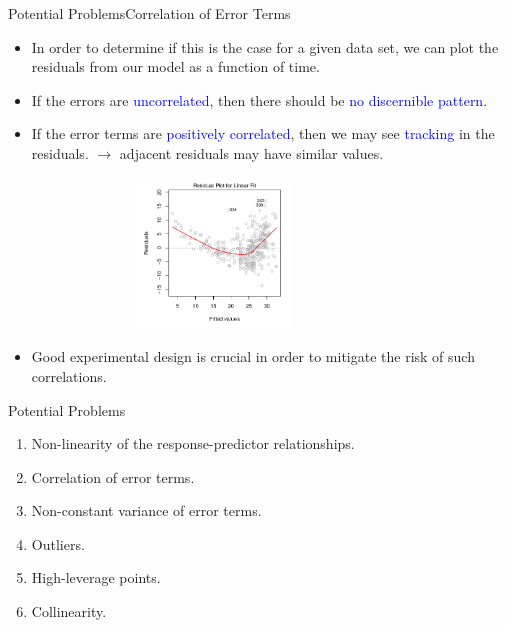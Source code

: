 \begin{frame}{Potential Problems}{Correlation of Error Terms}

\begin{itemize}
    \item In order to determine if this is the case for a given data set, we can plot the residuals from our model as a function of time. \pause

    \item If the errors are \textcolor{blue}{uncorrelated}, then there should be \textcolor{blue}{no discernible pattern}. \pause

    \item If the error terms are \textcolor{blue}{positively correlated}, then we may see \textcolor{blue}{tracking} in the residuals. \pause $\rightarrow$ adjacent residuals may have similar values. \pause

    
    \begin{figure}[!h]
    \centering
    \includegraphics[height=4cm, width=7.5cm]{other-lr/residual_fit.png}
    \end{figure} \pause
    \item Good experimental design is crucial in order to mitigate the risk of such correlations.
    
\end{itemize}

    
\end{frame}


\begin{frame}[noframenumbering]{Potential Problems}


\begin{enumerate}
    \item<1> Non-linearity of the response-predictor relationships.
    \item<1> Correlation of error terms.
    \item<1-2> Non-constant variance of error terms.
    \item<1> Outliers.
    \item<1> High-leverage points.
    \item<1> Collinearity.
\end{enumerate}
    
\end{frame}

